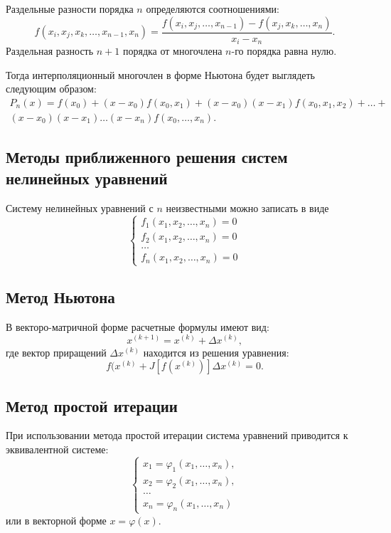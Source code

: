 \documentclass[12pt]{report}
\theoremstyle{definition}
\begin{document}
Раздельные разности порядка $n$ определяются соотношениями:
$$
f(x_i, x_j, x_k, \dots, x_{n-1}, x_n) = 
\dfrac{f(x_i, x_j, \dots, x_{n-1}) - f(x_j, x_k, \dots, x_n)}{x_i - x_n}.
$$
Раздельная разность $n+1$ порядка от многочлена $n$-го порядка
равна нулю.

Тогда интерполяционный многочлен в форме Ньютона будет выглядеть
следующим образом:
\begin{gather*}
P_n(x) = f(x_0) + (x-x_0) f(x_0, x_1) + 
(x - x_0) (x - x_1) f(x_0, x_1, x_2) +
\dots + \\
(x - x_0) (x - x_1) \dots (x - x_n) f(x_0, \dots, x_n).
\end{gather*}


\subsection{Методы приближенного решения систем нелинейных уравнений}
Систему нелинейных уравнений с $n$ неизвестными можно записать в виде
$$
\begin{cases}
f_1(x_1, x_2, \dots, x_n) = 0 \\
f_2(x_1, x_2, \dots, x_n) = 0 \\
\dots \\
f_n(x_1, x_2, \dots, x_n) = 0
\end{cases}
$$

\subsection{Метод Ньютона}
В векторо-матричной форме расчетные формулы имеют вид:
$$
x^{(k + 1)} = x^{(k)} + \Delta x^{(k)},
$$
где вектор приращений $\Delta x^{(k)}$ находится из решения
уравнения:
$$
f(x^{(k)} + J[f(x^{(k)})] \Delta x^{(k)} = 0.
$$

\subsection{Метод простой итерации}
При использовании метода простой итерации система уравнений приводится к
эквивалентной системе:
$$
\begin{cases}
x_1 = \varphi_1(x_1, \dots, x_n), \\
x_2 = \varphi_2(x_1, \dots, x_n), \\
\dots \\
x_n = \varphi_n(x_1, \dots, x_n)
\end{cases}
$$
или в векторной форме $x = \varphi(x)$.
\end{document}
